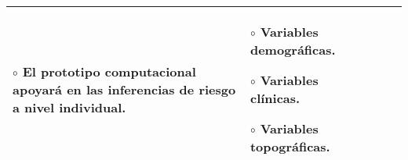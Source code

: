 \begin{landscape}
\begin{table}[h!]
\begin{tabular}{|p{4.5cm}|p{4.5cm}|p{4.5cm}|p{3cm}|p{4.2cm}|}
{    $\circ$ El prototipo computacional apoyará en las inferencias de riesgo a nivel individual.

    } & \multicolumn{1}{p{3cm}|}{
    \vspace{0.2cm}
    $\circ$ Variables demográficas.\vspace{0.2cm}

    $\circ$ Variables clínicas.\vspace{0.2cm}

    $\circ$ Variables topográficas.
    }  & \\ \hline
\end{tabular}
\end{table}
\end{landscape}

